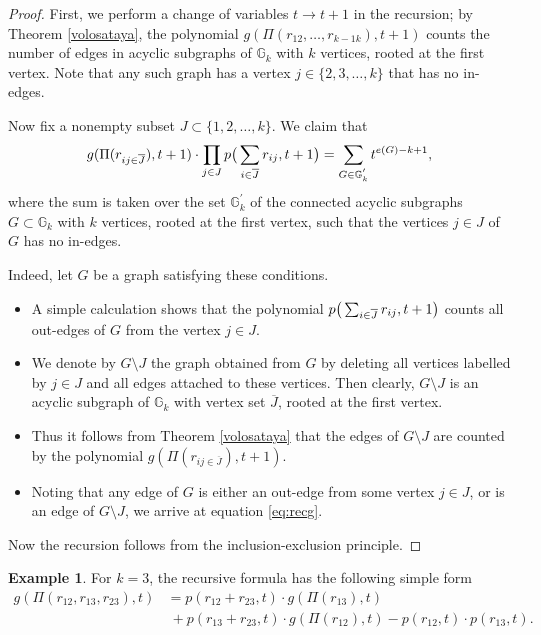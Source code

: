 \documentclass[11pt]{article}
\theoremstyle{definition}
\newtheorem{exam}[theo]{Example}
\numberwithin{equation}{section}
\begin{document}
\begin{proof}
First, we perform a change of variables $t\to t+1$ in the recursion; by Theorem \ref{volosataya}, the polynomial $g(\Pi(r_{12}, \ldots ,r_{k-1 k}), t+1)$ counts the number of edges in acyclic subgraphs of $\mathbb{G}_k$  with $k$ vertices, rooted at the first vertex. Note that any such graph has a vertex $j\in\{2,3, \ldots ,k\}$ that has no in-edges. 

Now fix a nonempty subset $J\subset\{1,2, \ldots ,k\}$. We claim that  
\begin{equation}\label{eq:recg}
g(\Pi(r_{ij\in \overline{J}}),t+1)\cdot\prod_{j\in J}p\big{(}\sum_{i\in\overline{J}}r_{ij},t+1\big{)} = \sum_{G\in\mathbb{G}^{'}_k} t^{e(G)-k+1},
\end{equation}
 where the sum is taken over the set $ \mathbb{G}^{'}_k $ of the connected acyclic subgraphs 
 $G\subset\mathbb{G}_k$  with $k$ vertices, rooted at the first vertex, such 
 that the vertices $j\in J$ of $G$ has no in-edges. 
 
 Indeed, let $G$ be a graph satisfying these conditions.
\begin{itemize}
\item A simple calculation shows that the polynomial $p\big{(}\sum_{i\in\overline{J}}r_{ij},t+1\big{)}$ counts  all out-edges of $G$ from the vertex $j\in J$.
\item We denote by $G\setminus J$ the graph obtained from $G$ by deleting all vertices labelled by $j\in J$ and all edges attached to these vertices. Then clearly, $G\setminus J$ is an acyclic subgraph of $\mathbb{G}_k$ with vertex set $\overline{J}$, rooted at the first vertex. 
\item Thus it follows from Theorem \ref{volosataya} that the edges of 
$G\setminus J$ are counted by the polynomial  $g(\Pi(r_{ij\in \overline{J}}),t+1)$.
\item Noting that any edge of $G$ is either an out-edge from some vertex $j\in J$, or is an edge of $G\setminus J$, we arrive at equation \eqref{eq:recg}. 
\end{itemize}
Now the recursion follows from the inclusion-exclusion principle.
\end{proof}
\begin{exam}
For $k=3$, the recursive formula has the following simple form
\begin{align*}
g(\Pi(r_{12},r_{13},r_{23}), t) &= p({r_{12}+r_{23},t})\cdot g(\Pi(r_{13}), t) \\
&\ + p{(r_{13}+r_{23}, t)}\cdot g(\Pi(r_{12}), t) - p{(r_{12},t)}\cdot p{(r_{13},t)}.
\end{align*}
\end{exam}
\end{document}
